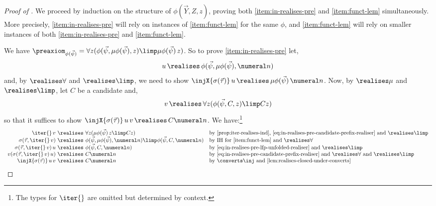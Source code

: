 \begin{proof}
[Proof of ]
    We proceed by induction on the structure of $\phi(\vec Y,Z,z)$, proving both \eqref{item:in-realises-pre} and \eqref{item:funct-lem} simultaneously.
    More precisely, \eqref{item:in-realises-pre} will rely on instances of \eqref{item:funct-lem} for the same $\phi$, and \eqref{item:funct-lem} will rely on smaller instances of both \eqref{item:in-realises-pre} and \eqref{item:funct-lem}.


    We have $\preaxiom_{\phi(\vec \psi)} = \forall z (\phi(\vec \psi,\mu\phi(\vec \psi),z) \limp \mu\phi(\vec \psi)\, z)$.
    So to prove \eqref{item:in-realises-pre} let, 
    \begin{equation}
        \label{eq:in-realises-pre-lfp-unfolded-realiser}
        u\, \realises \, \phi(\vec \psi,\mu\phi(\vec \psi),\numeral n)
    \end{equation}
    and, by $\realises\forall $ and $\realises\limp$, we need to show $\injX{\sigma(\vec \tau)}\, u\, \realises\, \mu\phi(\vec \psi)\, \numeral n$.
    Now, by $\realises\mu$ and $\realises\limp$, let $C$ be a candidate and, 
    \begin{equation}
    \label{eq:in-realises-pre-candidate-prefix-realiser}
        v\, \realises \, \forall z (\phi(\vec \psi,C,z) \limp Cz)
    \end{equation} 
    so that it suffices to show $ \injX{\sigma(\vec \tau)}\, u\, v\, \realises\, C\numeral n$.
    We have:\footnote{The types for $\iter{}$ are omitted but determined by context.}
    \[
    \begin{array}{r@{\ \realises \ }ll}
         \iter{}\, v & \forall z (\mu\phi(\vec \psi)\, z \limp Cz) & \text{by \Cref{prop:iter-realises-ind}, \eqref{eq:in-realises-pre-candidate-prefix-realiser} and $\realises\limp$} \\
         \sigma (\vec \tau,\iter{} \, v ) & \phi(\vec \psi,\mu\phi(\vec \psi),\numeral n) \limp \phi(\vec \psi,C,\numeral n) & \text{by IH for \cref{item:funct-lem} and $\realises \forall$} \\
         \sigma (\vec \tau,\iter{} \, v ) \, u & \phi(\vec \psi,C,\numeral n) & \text{by \eqref{eq:in-realises-pre-lfp-unfolded-realiser} and $\realises \limp$} \\
         v (\sigma (\vec \tau,\iter{} \, v ) \, u) & C\numeral n & \text{by \eqref{eq:in-realises-pre-candidate-prefix-realiser} and $\realises \forall $ and $\realises\limp$} \\
         \injX{\sigma(\vec \tau)}\, u\, v & C\numeral n & \text{by $\converts \inj$ and \Cref{lem:realises-closed-under-converts}}
    \end{array}
    \]


\end{proof}
